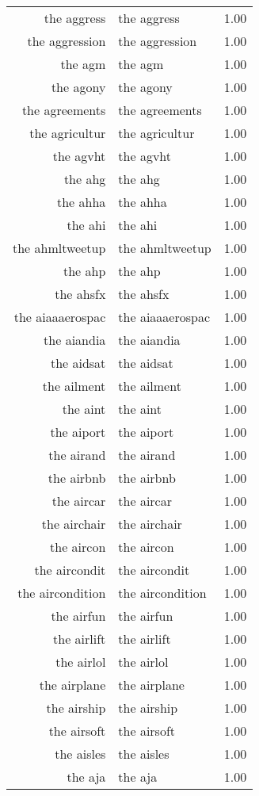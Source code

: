 \begin{table}[ht]
\begin{tabular}{rlr}
  the aggress & the aggress & 1.00 \\ 
  the aggression & the aggression & 1.00 \\ 
  the agm & the agm & 1.00 \\ 
  the agony & the agony & 1.00 \\ 
  the agreements & the agreements & 1.00 \\ 
  the agricultur & the agricultur & 1.00 \\ 
  the agvht & the agvht & 1.00 \\ 
  the ahg & the ahg & 1.00 \\ 
  the ahha & the ahha & 1.00 \\ 
  the ahi & the ahi & 1.00 \\ 
  the ahmltweetup & the ahmltweetup & 1.00 \\ 
  the ahp & the ahp & 1.00 \\ 
  the ahsfx & the ahsfx & 1.00 \\ 
  the aiaaaerospac & the aiaaaerospac & 1.00 \\ 
  the aiandia & the aiandia & 1.00 \\ 
  the aidsat & the aidsat & 1.00 \\ 
  the ailment & the ailment & 1.00 \\ 
  the aint & the aint & 1.00 \\ 
  the aiport & the aiport & 1.00 \\ 
  the airand & the airand & 1.00 \\ 
  the airbnb & the airbnb & 1.00 \\ 
  the aircar & the aircar & 1.00 \\ 
  the airchair & the airchair & 1.00 \\ 
  the aircon & the aircon & 1.00 \\ 
  the aircondit & the aircondit & 1.00 \\ 
  the aircondition & the aircondition & 1.00 \\ 
  the airfun & the airfun & 1.00 \\ 
  the airlift & the airlift & 1.00 \\ 
  the airlol & the airlol & 1.00 \\ 
  the airplane & the airplane & 1.00 \\ 
  the airship & the airship & 1.00 \\ 
  the airsoft & the airsoft & 1.00 \\ 
  the aisles & the aisles & 1.00 \\ 
  the aja & the aja & 1.00 \\ 

\end{tabular}
\end{table}
